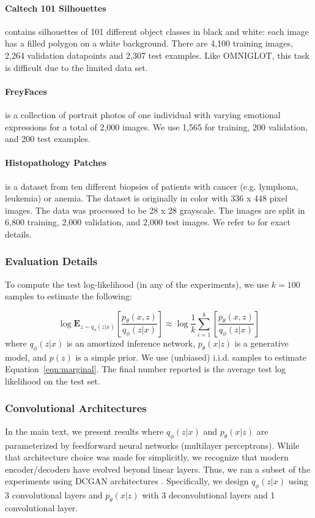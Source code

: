 \paragraph{Caltech 101 Silhouettes} contains silhouettes of 101 different object classes in black and white: each image has a filled polygon on a white background. There are 4,100 training images, 2,264 validation datapoints and 2,307 test examples. Like OMNIGLOT, this task is difficult due to the limited data set.

\paragraph{FreyFaces} is a collection of portrait photos of one individual with varying emotional expressions for a total of 2,000 images. We use 1,565 for training, 200 validation, and 200 test examples.

\paragraph{Histopathology Patches} is a dataset from ten different biopsies of patients with cancer (e.g. lymphona, leukemia) or anemia. The dataset is originally in color with 336 x 448 pixel images. The data was processed to be 28 x 28 grayscale. The images are split in 6,800 training, 2,000 validation, and 2,000 test images. We refer to \cite{tomczak2016improving} for exact details.

\subsubsection{Evaluation Details} To compute the test log-likelihood (in any of the experiments), we use $k=100$ samples to estimate the following:

\begin{equation}
    \log \mathbf{E}_{z \sim q_\phi(z|x)}[\frac{p_\theta(x, z)}{q_\phi(z|x)}] \approx \log \frac{1}{k}\sum_{i=1}^{k}[\frac{p_\theta(x, z)}{q_\phi(z|x)}]
    \label{eqn:marginal}
\end{equation}
where $q_\phi(z|x)$ is an amortized inference network, $p_\theta(x|z)$ is a generative model, and $p(z)$ is a simple prior. We use (unbiased) i.i.d. samples to estimate Equation~\ref{eqn:marginal}. The final number reported is the average test log likelihood on the test set.

\subsubsection{Convolutional Architectures}
In the main text, we present results where $q_\phi(z|x)$ and $p_\theta(x|z)$ are parameterized by feedforward neural networks (multilayer perceptrons). While that architecture choice was made for simplicitly, we recognize that modern encoder/decoders have evolved beyond linear layers. Thus, we ran a subset of the experiments using DCGAN architectures \cite{radford2015unsupervised}. Specifically, we design $q_\phi(z|x)$ using 3 convolutional layers and $p_\theta(x|z)$ with 3 deconvolutional layers and 1 convolutional layer.

